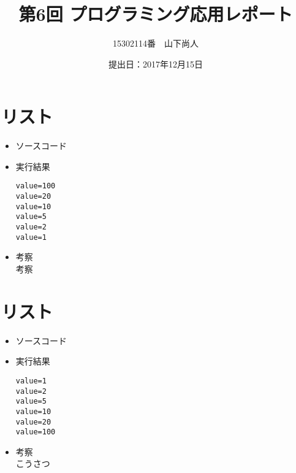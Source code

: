 \documentclass[a4paper]{jsarticle}
\title{第6回 プログラミング応用レポート}
\author{15302114番　山下尚人}
\date{提出日：2017年12月15日}
\begin{document}
\maketitle%

\section{リスト}
	\begin{itemize}
	\item ソースコード
		 
		\mbox{}\newline
	\item 実行結果
		\begin{lstlisting}
value=100
value=20
value=10
value=5
value=2
value=1
		\end{lstlisting}
		\mbox{}\newline
	\item 考察\mbox{}\\
		 考察
	\end{itemize}
	\newpage	%

\section{リスト}
	\begin{itemize}
	\item ソースコード
		 
		\mbox{}\newline
	\item 実行結果
		\begin{lstlisting}
value=1
value=2
value=5
value=10
value=20
value=100
		\end{lstlisting}
		\mbox{}\newline
	\item 考察\mbox{}\\
		こうさつ
	\end{itemize}
	\newpage	%
\end{document}
